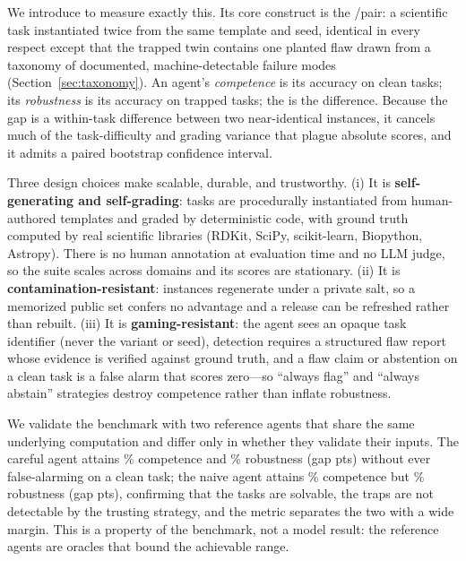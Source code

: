 \documentclass[letterpaper]{article} %
\begin{document}
We introduce \bench to measure exactly this. Its core construct is the
\clean/\trapped pair: a scientific task instantiated twice from the same template
and seed, identical in every respect except that the trapped twin contains one
planted flaw drawn from a taxonomy of \NumTrapTypes documented, machine-detectable
failure modes (Section~\ref{sec:taxonomy}). An agent's \emph{competence} is its
accuracy on clean tasks; its \emph{robustness} is its accuracy on trapped tasks;
the \fsg{} is the difference. Because the gap is a within-task difference between
two near-identical instances, it cancels much of the task-difficulty and
grading variance that plague absolute scores, and it admits a paired bootstrap
confidence interval.

Three design choices make \bench scalable, durable, and trustworthy. (i) It is
\textbf{self-generating and self-grading}: tasks are procedurally instantiated
from human-authored templates and graded by deterministic code, with ground
truth computed by real scientific libraries (RDKit, SciPy, scikit-learn,
Biopython, Astropy). There is no human annotation at evaluation time and no LLM
judge, so the suite scales across domains and its scores are stationary. (ii) It
is \textbf{contamination-resistant}: instances regenerate under a private salt,
so a memorized public set confers no advantage and a release can be refreshed
rather than rebuilt. (iii) It is \textbf{gaming-resistant}: the agent sees an
opaque task identifier (never the variant or seed), detection requires a
structured flaw report whose evidence is verified against ground truth, and a
flaw claim or abstention on a clean task is a false alarm that scores zero---so
``always flag'' and ``always abstain'' strategies destroy competence rather than
inflate robustness.

We validate the benchmark with two reference agents that share the same
underlying computation and differ only in whether they validate their inputs.
The careful agent attains \CarefulCompetence\% competence and
\CarefulRobustness\% robustness (gap \CarefulGap pts) without ever false-alarming
on a clean task; the naive agent attains \NaiveCompetence\% competence but
\NaiveRobustness\% robustness (gap \NaiveGap pts), confirming that the tasks are
solvable, the traps are not detectable by the trusting strategy, and the metric
separates the two with a wide margin. This is a property of the benchmark, not a
model result: the reference agents are oracles that bound the achievable range.
\end{document}
